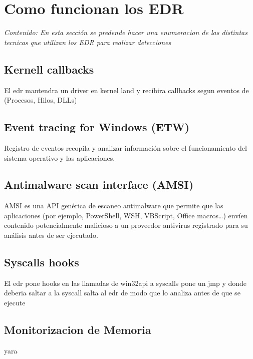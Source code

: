 \chapter{Como funcionan los EDR}

\textit{Contenido: En esta sección se predende hacer una enumeracion de las 
distintas tecnicas que utilizan los EDR para realizar detecciones}
\vspace{1em}

\section{Kernell callbacks}

El edr mantendra un driver en kernel land y recibira callbacks segun eventos 
de (Procesos, Hilos, DLLs)

\section{Event tracing for Windows (ETW)}

Registro de eventos recopila y analizar información sobre el funcionamiento 
del sistema operativo y las aplicaciones.

\section{Antimalware scan interface (AMSI)}

AMSI es una API genérica de escaneo antimalware que permite que las aplicaciones
(por ejemplo, PowerShell, WSH, VBScript, Office macros…) envíen contenido 
potencialmente malicioso a un proveedor antivirus registrado para su análisis 
antes de ser ejecutado.

\section{Syscalls hooks}

El edr pone hooks en las llamadas de win32api a syscalls
pone un jmp y donde deberia saltar a la syscall salta al edr de modo que lo 
analiza antes de que se ejecute

\section{Monitorizacion de Memoria}

yara
